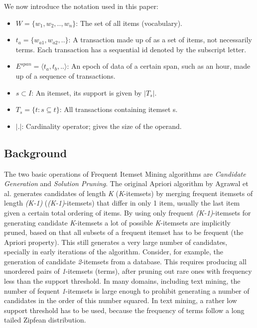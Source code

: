 \documentclass{sig-alternate}
\begin{document}

We now introduce the notation used in this paper:

\begin{itemize}
\item $W = \{w_1,w_2,.., w_n\}$: The set of all items (vocabulary).
\item $t_a = \{w_{a1},w_{a2},..\}$: A transaction made up of as a set of items, not necessarily terms. Each transaction has a sequential id denoted by the subscript letter.
\item $E^{span} = \langle t_a, t_b, ..\rangle$: An epoch of data of a certain span, such as an hour, made up of a sequence of transactions.
\item $s \subset I$: An itemset, its support is given by $|T_s|$.
\item $T_s = \{t: s \subseteq t\}$: All transactions containing itemset s.
\item $|.|$: Cardinality operator; gives the size of the operand.

\end{itemize}

\subsection{Background}

The two basic operations of Frequent Itemset Mining algorithms are \emph{Candidate Generation} and \emph{Solution Pruning}. The original Apriori algorithm by Agrawal et al. \cite{agrawal1994fast} generates candidates of length \emph{K} (\emph{K}-itemsets) by merging frequent itemsets of length \emph{(K-1)} (\emph{(K-1)}-itemsets) that differ in only 1 item, usually the last item given a certain total ordering of items. By using only frequent  \emph{(K-1)}-itemsets for generating candidate \emph{K}-itemsets a lot of possible \emph{K}-itemsets are implicitly pruned, based on that all subsets of a frequent itemset has to be frequent (the Apriori property). This still generates a very large number of candidates, specially in early iterations of the algorithm. Consider, for example, the generation of candidate \emph{2}-itemsets from a database. This requires producing all unordered pairs of \emph{1}-itemsets (terms), after pruning out rare ones with frequency less than the support threshold. In many domains, including text mining, the number of fequent \emph{1}-itemsets is large enough to prohibit generating a number of candidates in the order of this number squared. In text mining, a rather low support threshold has to be used, because the frequency of terms follow a long tailed Zipfean distribution.
\end{document}
